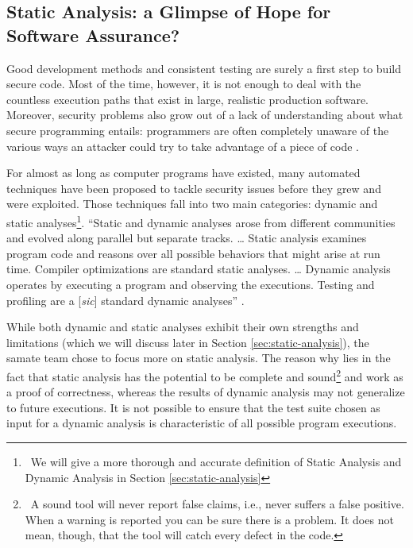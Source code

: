 \subsection{Static Analysis: a Glimpse of Hope for Software Assurance?}

\vspace{1cm}

Good development methods and consistent testing are surely a first step to build secure code. Most of the time, however, it is not enough to deal with the countless execution paths that exist in large, realistic production software. Moreover, security problems also grow out of a lack of understanding about what secure programming entails: programmers are often completely unaware of the various ways an attacker could try to take advantage of a piece of code \cite{chess2007secure}.

\vspace{0.3cm}

For almost as long as computer programs have existed, many automated techniques \cite{nist2016classes} have been proposed to tackle security issues before they grew and were exploited. Those techniques fall into two main categories: dynamic and static analyses\footnote{~We will give a more thorough and accurate definition of Static Analysis and Dynamic Analysis in Section \ref{sec:static-analysis}}. ``Static and dynamic analyses arose from different communities and evolved along parallel but separate tracks. \dots{} Static analysis examines program code and reasons over all possible behaviors that might arise at run time. Compiler optimizations are standard static analyses. \dots{} Dynamic analysis operates by executing a program and observing the executions. Testing and profiling are a [\emph{sic}] standard dynamic analyses'' \cite{ernst2003static}.

\vspace{0.3cm}

While both dynamic and static analyses exhibit their own strengths and limitations (which we will discuss later in Section \ref{sec:static-analysis}), the \gls{samate} team chose to focus more on static analysis. The reason why lies in the fact that static analysis has the potential to be complete and sound\footnote{~A sound tool will never report false claims, i.e., never suffers a false positive. When a warning is reported you can be sure there is a problem. It does not mean, though, that the tool will catch every defect in the code.} and work as a proof of correctness, whereas the results of dynamic analysis may not generalize to future executions. It is not possible to ensure that the test suite chosen as input for a dynamic analysis is characteristic of all possible program executions.

